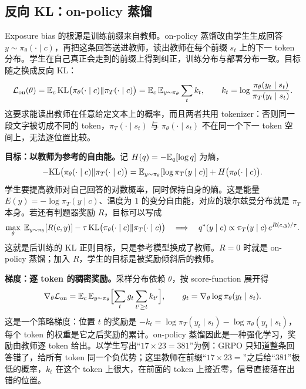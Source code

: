 \subsection{反向 KL：on-policy 蒸馏}

Exposure bias 的根源是训练前缀来自教师。on-policy 蒸馏改由学生生成回答 \(y\sim\pi_\theta(\cdot\mid c)\)，再把这条回答送进教师，读出教师在每个前缀 \(s_t\) 上的下一 token 分布。学生在自己真正会走到的前缀上得到纠正，训练分布与部署分布一致。目标随之换成反向 KL：
\begin{equation}
 \mathcal L_{\mathrm{on}}(\theta)=\mathbb{E}_c\,\mathrm{KL}\bigl(\pi_\theta(\cdot\mid c)\Vert\pi_T(\cdot\mid c)\bigr)
 =\mathbb{E}_c\,\mathbb{E}_{y\sim\pi_\theta}\sum_t k_t,\qquad
 k_t=\log\frac{\pi_\theta(y_t\mid s_t)}{\pi_T(y_t\mid s_t)}.
 \label{eq:on-policy-kd}
\end{equation}
这要求能读出教师在任意给定文本上的概率，而且两者共用 tokenizer：否则同一段文字被切成不同的 token，\(\pi_T(\cdot\mid s_t)\) 与 \(\pi_\theta(\cdot\mid s_t)\) 不在同一个下一 token 空间上，无法逐位置比较。

\textbf{目标：以教师为参考的自由能。}记 \(H(q)=-\mathbb{E}_q[\log q]\) 为熵，
\begin{equation}
 -\mathrm{KL}\bigl(\pi_\theta(\cdot\mid c)\Vert\pi_T(\cdot\mid c)\bigr)=\mathbb{E}_{y\sim\pi_\theta}[\log\pi_T(y\mid c)]+H\bigl(\pi_\theta(\cdot\mid c)\bigr).
\end{equation}
学生要提高教师对自己回答的对数概率，同时保持自身的熵。这是能量 \(E(y)=-\log\pi_T(y\mid c)\)、温度为 \(1\) 的变分自由能，对应的玻尔兹曼分布就是 \(\pi_T\) 本身。若还有判题器奖励 \(R\)，目标可以写成
\begin{equation}
 \max_\theta\;\mathbb{E}_{y\sim\pi_\theta}[R(c,y)]-\tau\,\mathrm{KL}\bigl(\pi_\theta(\cdot\mid c)\Vert\pi_T(\cdot\mid c)\bigr)
 \quad\Longrightarrow\quad
 q^*(y\mid c)\propto\pi_T(y\mid c)\,e^{R(c,y)/\tau}.
 \label{eq:teacher-reference}
\end{equation}
这就是后训练的 KL 正则目标，只是参考模型换成了教师。\(R=0\) 时就是 on-policy 蒸馏；加入 \(R\)，学生的目标是被奖励倾斜后的教师。

\textbf{梯度：逐 token 的稠密奖励。}采样分布依赖 \(\theta\)，按 score-function 展开得
\begin{equation}
 \nabla_\theta\mathcal L_{\mathrm{on}}
 =\mathbb{E}_c\,\mathbb{E}_{y\sim\pi_\theta}\Bigl[\sum_{t}g_t\sum_{t'\ge t}k_{t'}\Bigr],\qquad g_t=\nabla_\theta\log\pi_\theta(y_t\mid s_t).
 \label{eq:on-policy-kd-grad}
\end{equation}
这是一个策略梯度：位置 \(t\) 的奖励是 \(-k_t=\log\pi_T(y_t\mid s_t)-\log\pi_\theta(y_t\mid s_t)\)，每个 token 的权重是它之后奖励的累计。on-policy 蒸馏因此是一种强化学习，奖励由教师逐 token 给出。以学生写出“\(17\times23=381\)”为例：GRPO 只知道整条回答错了，给所有 token 同一个负优势；这里教师在前缀“\(17\times23=\)”之后给“381”极低的概率，\(k_t\) 在这个 token 上很大，在前面的 token 上接近零，信号直接落在出错的位置。

